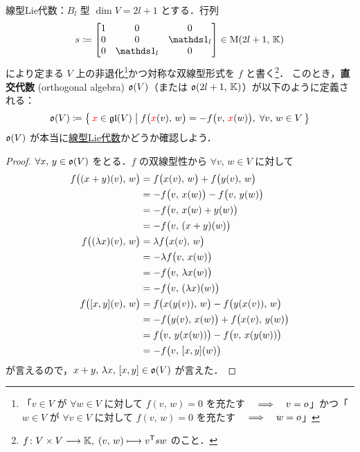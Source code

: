 \documentclass[rep_main]{subfiles}
\begin{document}
\begin{myexample}[label=def:typeB]{線型Lie代数：$B_l$ 型}
    $\dim V = 2l + 1$ とする．行列
    \begin{align}
        s \coloneqq \mqty[
            1 & 0 & 0 \\
            0 & 0 & \unity_l \\
            0 & \unity_l & 0
        ] \in \Mat{2l+1}{\mathbb{K}}
    \end{align}
    により定まる $V$ 上の非退化\footnote{「$v \in V$ が $\forall w \in V$ に対して $f(v,\, w) = 0$ を充たす $\quad \Longrightarrow \quad v = o$」かつ「$w \in V$ が $\forall v \in V$ に対して $f(v,\, w) = 0$ を充たす $\quad \Longrightarrow \quad w = o$」}かつ対称な双線型形式を $f$ と書く\footnote{$f \colon V \times V \longrightarrow \mathbb{K},\; (v,\, w) \longmapsto v^{\mathsf{T}} s w$ のこと．}．
    このとき，\textbf{直交代数} (orthogonal algebra) $\mathfrak{o} (V)$（または $\mathfrak{o}(2l+1,\, \mathbb{K})$）が以下のように定義される：
    \begin{align}
        \mathfrak{o} (V) \coloneqq \bigl\{\, \textcolor{red}{x} \in \mathfrak{gl} (V) \bigm| f \bigl( \textcolor{red}{x}(v),\, w \bigr) = -f \bigl( v,\, \textcolor{red}{x}(w) \bigr),\; \forall v,\, w \in V \,\bigr\} 
    \end{align}
    $\mathfrak{o} (V)$ が本当に\hyperref[def:linearLieAlg]{線型Lie代数}かどうか確認しよう．
    \begin{proof}
        $\forall x,\, y \in \mathfrak{o} (V)$ をとる．$f$ の双線型性から $\forall v,\, w \in V$ に対して
        \begin{align}
            f \bigl( (x+y)(v),\, w \bigr) 
            &= f \bigl( x(v),\, w \bigr) + f \bigl( y(v),\, w \bigr) \\
            &= - f \bigl( v,\, x(w) \bigr) - f \bigl( v,\, y(w) \bigr) \\
            &= - f \bigl( v,\, x(w) + y(w) \bigr) \\
            &= - f \bigl( v,\, (x+y)(w) \bigr) \\
            f \bigl( (\lambda x)(v),\, w \bigr)  
            &= \lambda f \bigl( x(v),\, w \bigr) \\
            &= - \lambda f \bigl( v,\, x(w) \bigr) \\
            &= - f \bigl( v,\, \lambda x(w) \bigr) \\
            &= - f \bigl( v,\, (\lambda x)(w) \bigr) \\
            f \bigl(\comm{x}{y}(v),\, w \bigr) 
            &= f \bigl(x(y(v)),\, w \bigr) - f \bigl(y(x(v)),\, w \bigr) \\
            &= - f \bigl(y(v),\, x(w) \bigr) + f \bigl(x(v),\, y(w) \bigr) \\
            &= f \bigl( v,\, y(x(w)) \bigr) - f \bigl( v,\, x(y(w)) \bigr) \\
            &= - f \bigl( v,\, \comm{x}{y}(w) \bigr) 
        \end{align}
        が言えるので，$x + y,\, \lambda x,\, \comm{x}{y} \in \Lo (V)$ が言えた．
    \end{proof}
\end{myexample}
\end{document}
